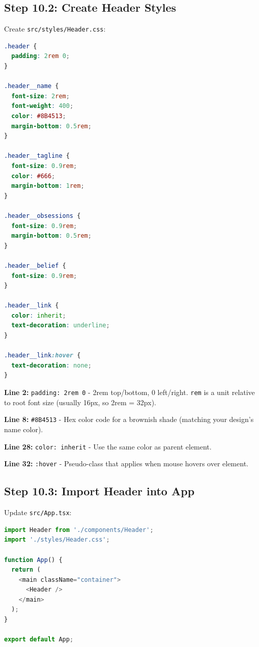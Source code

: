 \documentclass[12pt,a4paper]{article}
\begin{document}
\subsection{Step 10.2: Create Header Styles}

Create \texttt{src/styles/Header.css}:

\begin{lstlisting}[language=CSS,caption={src/styles/Header.css}]
.header {
  padding: 2rem 0;
}

.header__name {
  font-size: 2rem;
  font-weight: 400;
  color: #8B4513;
  margin-bottom: 0.5rem;
}

.header__tagline {
  font-size: 0.9rem;
  color: #666;
  margin-bottom: 1rem;
}

.header__obsessions {
  font-size: 0.9rem;
  margin-bottom: 0.5rem;
}

.header__belief {
  font-size: 0.9rem;
}

.header__link {
  color: inherit;
  text-decoration: underline;
}

.header__link:hover {
  text-decoration: none;
}
\end{lstlisting}

\begin{explanation}
\textbf{Line 2:} \texttt{padding: 2rem 0} - 2rem top/bottom, 0 left/right. \texttt{rem} is a unit relative to root font size (usually 16px, so 2rem = 32px).

\textbf{Line 8:} \texttt{\#8B4513} - Hex color code for a brownish shade (matching your design's name color).

\textbf{Line 28:} \texttt{color: inherit} - Use the same color as parent element.

\textbf{Line 32:} \texttt{:hover} - Pseudo-class that applies when mouse hovers over element.
\end{explanation}

\subsection{Step 10.3: Import Header into App}

Update \texttt{src/App.tsx}:

\begin{lstlisting}[language=JavaScript,caption={src/App.tsx with Header}]
import Header from './components/Header';
import './styles/Header.css';

function App() {
  return (
    <main className="container">
      <Header />
    </main>
  );
}

export default App;
\end{lstlisting}
\end{document}
